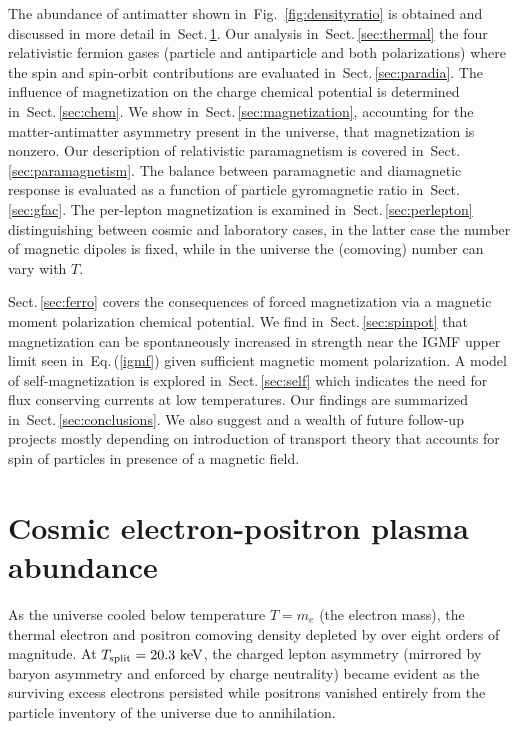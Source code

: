 \documentclass[aps,prd,floatfix,reprint]{revtex4-2}
\newcommand*{\keV}{\text{ keV}}
\newcommand{\req}[1]{Eq.\,(\ref{#1})}
\newcommand{\rf}[1]{Fig.~{\ref{#1}}}
\newcommand{\rsec}[1]{Sect.\,{\ref{#1}}}
\begin{document}
The abundance of antimatter shown in~\rf{fig:densityratio} is obtained and discussed in more detail in~\rsec{sec:abundance}. Our analysis in~\rsec{sec:thermal} the four relativistic fermion gases (particle and antiparticle and both polarizations) where the spin and spin-orbit contributions are evaluated in~\rsec{sec:paradia}. The influence of magnetization on the charge chemical potential is determined in~\rsec{sec:chem}.  We show in~\rsec{sec:magnetization}, accounting for the matter-antimatter asymmetry present in the universe, that magnetization is nonzero. Our description of relativistic paramagnetism is covered in~\rsec{sec:paramagnetism}. The balance between paramagnetic and diamagnetic response is evaluated as a function of particle gyromagnetic ratio in~\rsec{sec:gfac}. The per-lepton magnetization is examined in~\rsec{sec:perlepton} distinguishing between cosmic and laboratory cases, in the latter case the number of magnetic dipoles is fixed, while in the universe the (comoving) number can  vary  with $T$. 

\rsec{sec:ferro} covers the consequences of forced magnetization via a magnetic moment polarization chemical potential. We find in~\rsec{sec:spinpot} that magnetization can be spontaneously increased in strength near the IGMF upper limit seen in~\req{igmf} given sufficient magnetic moment polarization. A model of self-magnetization is explored in~\rsec{sec:self} which indicates the need for flux conserving currents at low temperatures. Our findings are summarized in~\rsec{sec:conclusions}. We also suggest and a wealth of future follow-up projects mostly depending on introduction of transport theory that accounts for spin of particles in presence of a magnetic field.

\section{Cosmic electron-positron plasma abundance}
\label{sec:abundance}
\noindent As the universe cooled below temperature $T=m_{e}$ (the electron mass), the thermal electron and positron comoving density depleted by over eight orders of magnitude. At $T_{\rm split}=20.3\keV$, the charged lepton asymmetry (mirrored by baryon asymmetry and enforced by charge neutrality) became evident as the surviving excess electrons persisted while positrons vanished entirely from the particle inventory of the universe due to annihilation.
\end{document}
